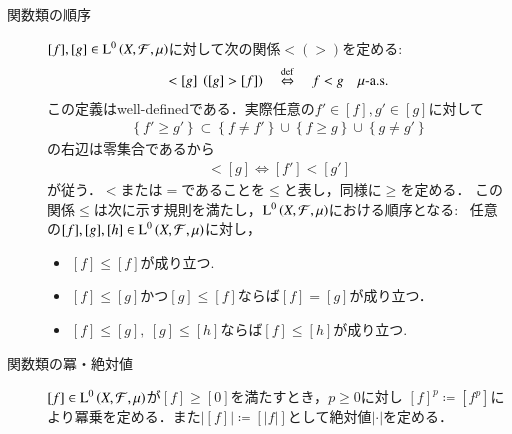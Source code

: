 \begin{description}
	\item[関数類の順序]
		$[f],[g] \in \operatorname{L}^{0} \left(X,\mathcal{F},\mu\right)$に対して次の関係$<(>)$を定める:
		\begin{align}
			[f] < [g]\ \left( [g] > [f] \right) \quad \DEF \quad f < g \quad \mbox{$\mu$-a.s.} \label{dfn:equiv_class_order}
		\end{align}
		この定義はwell-definedである．実際任意の$f' \in [f],g' \in [g]$に対して
		\begin{align}
			\left\{ f' \geq g' \right\} \subset \left\{ f \neq f' \right\} \cup \left\{ f \geq g \right\} \cup \left\{ g \neq g' \right\}
		\end{align}
		の右辺は零集合であるから
		\begin{align}
			[f] < [g] \Leftrightarrow [f'] < [g']
		\end{align}
		が従う．$<$または$=$であることを$\leq$と表し，同様に$\geq$を定める．
		この関係$\leq$は次に示す規則を満たし，$\operatorname{L}^{0} \left(X,\mathcal{F},\mu\right)$における順序となる:
		\ 任意の$[f],[g],[h] \in \operatorname{L}^{0} \left(X,\mathcal{F},\mu\right)$に対し，
		\begin{itemize}
			\item $[f] \leq [f]$が成り立つ.
			\item $[f] \leq [g]$かつ$[g] \leq [f]$ならば$[f] = [g]$が成り立つ．
			\item $[f] \leq [g],\ [g] \leq [h]$ならば$[f] \leq [h]$が成り立つ.
		\end{itemize}
		
	\item[関数類の冪・絶対値]
		$[f] \in \operatorname{L}^{0} \left(X,\mathcal{F},\mu\right)$が$[f] \geq [0]$を満たすとき，$p \geq 0$に対し
		$[f]^p \coloneqq [f^p]$により冪乗を定める．また$|[f]| \coloneqq [|f|]$として絶対値$|\cdot|$を定める．
\end{description}

